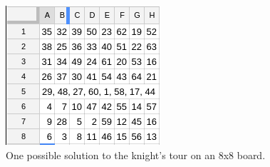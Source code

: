 \documentclass{article}
\begin{document}
	\begin{center}
		\begin{figure}[h]
			\includegraphics[width = \textwidth]{board}
			\caption {One possible solution to the knight's tour on an 8x8 board.}
		\end{figure}
	\end{center}
\end{document}
